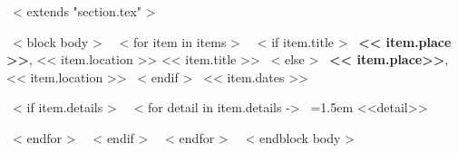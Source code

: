 ~< extends "section.tex" >~

~< block body >~
    ~< for item in items >~
      ~< if item.title >~
      \textbf{<< item.place >>}, << item.location >> << item.title >> 
      ~< else >~
      \textbf{<< item.place>>}, << item.location >>
      ~< endif >~
      \hfill << item.dates >> \par
        ~< if item.details >~
        ~< for detail in item.details ->~
            \hangindent=1.5em
            \textbullet\; <<detail>> \par
        ~< endfor >~
        ~< endif >~
    \vspace{3mm}
    ~< endfor >~
\vspace{-3mm}
~< endblock body >~
